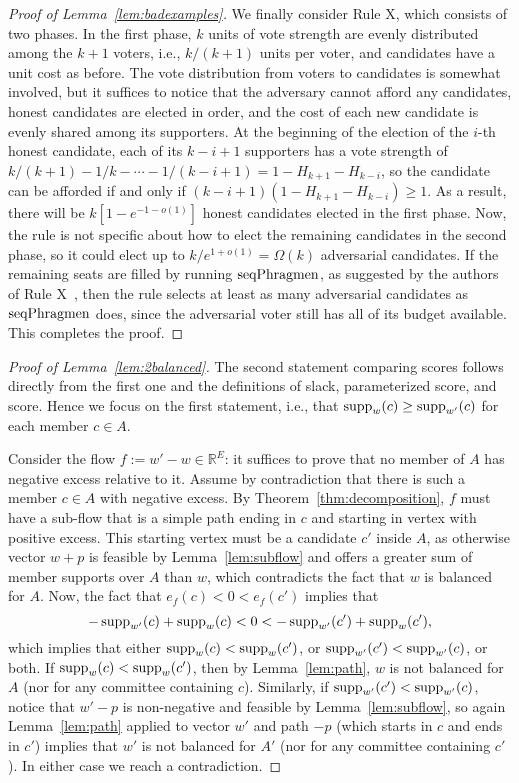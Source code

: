 \begin{proof}[Proof of Lemma~\ref{lem:badexamples}]
We finally consider Rule X, which consists of two phases. 
In the first phase, $k$ units of vote strength are evenly distributed among the $k+1$ voters, i.e., $k/(k+1)$ units per voter, and candidates have a unit cost as before. 
The vote distribution from voters to candidates is somewhat involved, but it suffices to notice that the adversary cannot afford any candidates, honest candidates are elected in order, and the cost of each new candidate is evenly shared among its supporters. 
At the beginning of the election of the $i$-th honest candidate, each of its $k-i+1$ supporters has a vote strength of $k/(k+1) - 1/k - \cdots - 1/(k-i+1)=1-H_{k+1}-H_{k-i}$, so the candidate can be afforded if and only if $(k-i+1)(1-H_{k+1} - H_{k-i})\geq 1$. As a result, there will be $k[1- e^{-1-o(1)}]$ honest candidates elected in the first phase. 
Now, the rule is not specific about how to elect the remaining candidates in the second phase, so it could elect up to $k/e^{1+o(1)}=\Omega(k)$ adversarial candidates. 
If the remaining seats are filled by running $\operatorname{seqPhragmen}$, as suggested by the authors of Rule X~\cite{peters2019proportionality}, then the rule selects at least as many adversarial candidates as $\operatorname{seqPhragmen}$ does, since the adversarial voter still has all of its budget available. This completes the proof.
\end{proof}

\begin{proof}[Proof of Lemma~\ref{lem:2balanced}]
The second statement comparing scores follows directly from the first one and the definitions of slack, parameterized score, and score. Hence we focus on the first statement, i.e., that $\operatorname{supp}_w(c)\geq \operatorname{supp}_{w'}(c)$ for each member $c\in A$.

Consider the flow $f:=w'-w\in\mathbb{R}^E$: it suffices to prove that no member of $A$ has negative excess relative to it. Assume by contradiction that there is such a member $c\in A$ with negative excess.  
By Theorem~\ref{thm:decomposition}, $f$ must have a sub-flow that is a simple path ending in $c$ and starting in vertex with positive excess. 
This starting vertex must be a candidate $c'$ inside $A$, as otherwise vector $w+p$ is feasible by Lemma~\ref{lem:subflow} and offers a greater sum of member supports over $A$ than $w$, which contradicts the fact that $w$ is balanced for $A$. 
Now, the fact that $e_f(c) < 0 < e_f(c')$ implies that 
$$- \operatorname{supp}_{w'}(c) + \operatorname{supp}_{w}(c) <0< - \operatorname{supp}_{w'}(c') + \operatorname{supp}_{w}(c'),$$
which implies that either $\operatorname{supp}_{w}(c)<\operatorname{supp}_{w}(c')$, or $\operatorname{supp}_{w'}(c')<\operatorname{supp}_{w'}(c)$, or both. 
If $\operatorname{supp}_{w}(c)<\operatorname{supp}_{w}(c')$, then by Lemma~\ref{lem:path}, $w$ is not balanced for $A$ (nor for any committee containing $c$). 
Similarly, if $\operatorname{supp}_{w'}(c')<\operatorname{supp}_{w'}(c)$, notice that $w'-p$ is non-negative and feasible by Lemma~\ref{lem:subflow}, so again Lemma~\ref{lem:path} applied to vector $w'$ and path $-p$ (which starts in $c$ and ends in $c'$) implies that $w'$ is not balanced for $A'$ (nor for any committee containing $c'$). 
In either case we reach a contradiction.
\end{proof}

